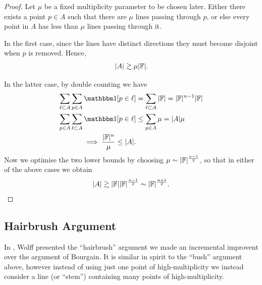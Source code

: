 \begin{proof}
    Let $\mu$ be a fixed multiplicity parameter to be chosen later. Either there exists a point $p\in A$ such that there are $\mu$ lines passing through $p$,
    or else every point in $A$ has less than $\mu$ lines passing through it.

    In the first case, since the lines have distinct directions they must become disjoint when $p$ is removed. Hence,
    \[
      |A| \gtrsim \mu |\mathbb F| .
    \]

    In the latter case, by double counting we have
    \begin{align*}
         \sum_{\ell \subset A} \sum_{p \in A} \OO[p \in \ell] &= \sum_{\ell \subset A} |\FF| = |\FF|^{n-1} |\FF| \\
        \sum_{p \in A} \sum_{\ell \subset A} \OO[p \in \ell] &\leq \sum_{p \in A} \mu = |A|\mu \\
        \implies \frac{|\FF|^{n}}{\mu} \leq |A|.
    \end{align*}
    Now we optimise the two lower bounds by choosing $\mu \sim |\mathbb F|^{\frac{n-1}{2}}$, so that in either of the above cases we obtain
    \[
        |A| \gtrsim |\mathbb F||\mathbb F|^{\frac{n-1}{2}} \sim |\mathbb F|^{\frac{n+1}{2}}.
    \]

\end{proof}

\subsection{Hairbrush Argument}
In \cite{WOLFF1995}, Wolff presented the ``hairbrush'' argument we made an incremental improvent over the argument of Bourgain. It is similar in spirit to the ``bush'' argument above, however instead of using just one point of high-multiplicity we instead consider a line (or ``stem'') containing many points of high-multiplicity. 

